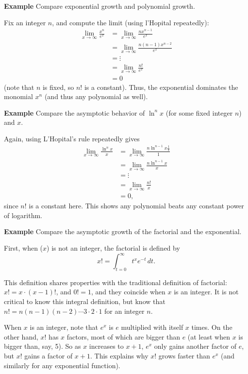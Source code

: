 \documentclass[twoside,openright,titlepage,a4paper]{book}
\begin{document}
\begin{sloppypar}
\textbf{Example} Compare exponential growth and polynomial growth. 
\begin{examplebox}
Fix an integer $n$, and compute the limit (using l'Hopital repeatedly):
\begin{align*}
\lim_{x \rightarrow \infty} \frac{x^n}{e^x} &= \lim_{x \rightarrow \infty} \frac{nx^{n-1}}{e^x} \\
&= \lim_{x \rightarrow \infty} \frac{n(n-1)x^{n-2}}{e^x} \\
&= \vdots \\
&= \lim_{x \rightarrow \infty} \frac{n!}{e^x} \\
&= 0
\end{align*}
(note that $n$ is fixed, so $n!$ is a constant). Thus, the exponential dominates the monomial $x^n$ (and thus any polynomial as well).
\end{examplebox}

\textbf{Example} Compare the asymptotic behavior of $\ln^n x$ (for some fixed integer $n$) and $x$.
\begin{examplebox}
Again, using L'Hopital's rule repeatedly gives
\begin{align*}
\lim_{x \rightarrow \infty} \frac{\ln^n x}{x} &= \lim_{x \rightarrow \infty} \frac{n \ln^{n-1} x \frac{1}{x}}{1} \\
&= \lim_{x \rightarrow \infty} \frac{n \ln^{n-1} x}{x} \\
&= \vdots \\
&= \lim_{x \rightarrow \infty} \frac{n!}{x} \\
&= 0,
\end{align*}
since $n!$ is a constant here. This shows any polynomial beats any constant power of logarithm.
\end{examplebox}

\textbf{Example} Compare the asymptotic growth of the factorial and the exponential.
\begin{examplebox}
First, when ($x$) is not an integer, the factorial is defined by \[ x! = \int_{t=0}^\infty t^x e^{-t} \, dt. \]

This definition shares properties with the traditional definition of factorial: $x! = x \cdot (x-1)!$, and $0! = 1$, and they coincide when $x$ is an integer. It is not critical to know this integral definition, but know that $n! = n(n-1)(n-2)\dotsb 3 \cdot 2 \cdot 1$ for an integer $n$.

When $x$ is an integer, note that $e^x$ is $e$ multiplied with itself $x$ times. On the other hand, $x!$ has $x$ factors, most of which are bigger than $e$ (at least when $x$ is bigger than, say, 5). So as $x$ increases to $x+1$, $e^x$ only gains another factor of $e$, but $x!$ gains a factor of $x+1$. This explains why $x!$ grows faster than $e^x$ (and similarly for any exponential function).
\end{examplebox}


\end{sloppypar}
\end{document}
